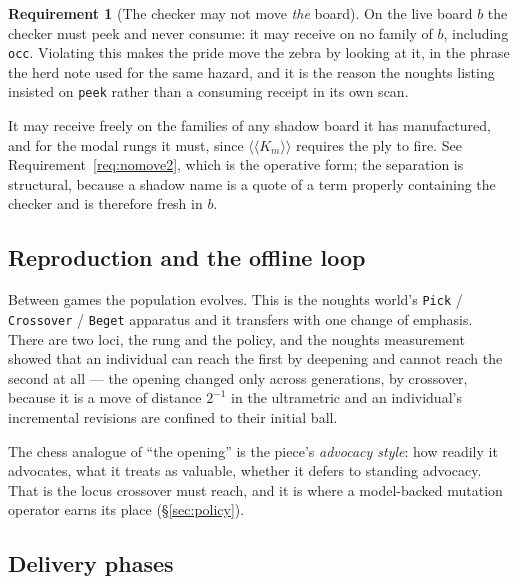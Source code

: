 \documentclass[11pt,a4paper]{article}
\theoremstyle{plain}
\theoremstyle{definition}
\newtheorem{requirement}[theorem]{Requirement}
\theoremstyle{remark}
\newcommand{\KKmod}[1]{\langle\!\langle K_{#1}\rangle\!\rangle}
\begin{document}
\begin{requirement}[The checker may not move \emph{the} board]
\label{req:nomove}
On the live board $b$ the checker must peek and never consume: it may receive
on no family of $b$, including \texttt{occ}. Violating this makes the pride move
the zebra by looking at it, in the phrase the herd note used for the same
hazard, and it is the reason the noughts listing insisted on \texttt{peek}
rather than a consuming receipt in its own scan.

It may receive freely on the families of any shadow board it has manufactured,
and for the modal rungs it must, since $\KKmod{m}$ requires the ply to fire.
See Requirement~\ref{req:nomove2}, which is the operative form; the separation
is structural, because a shadow name is a quote of a term properly containing
the checker and is therefore fresh in $b$.
\end{requirement}

\subsection{Reproduction and the offline loop}
\label{sec:repro}

Between games the population evolves. This is the noughts world's
\texttt{Pick} / \texttt{Crossover} / \texttt{Beget} apparatus and it transfers
with one change of emphasis. There are two loci, the rung and the policy, and
the noughts measurement showed that an individual can reach the first by
deepening and cannot reach the second at all --- the opening changed only across
generations, by crossover, because it is a move of distance $2^{-1}$ in the
ultrametric and an individual's incremental revisions are confined to their
initial ball.

The chess analogue of ``the opening'' is the piece's \emph{advocacy style}: how
readily it advocates, what it treats as valuable, whether it defers to standing
advocacy. That is the locus crossover must reach, and it is where a model-backed
mutation operator earns its place (\S\ref{sec:policy}).

\subsection{Delivery phases}
\label{sec:phases}
\end{document}
